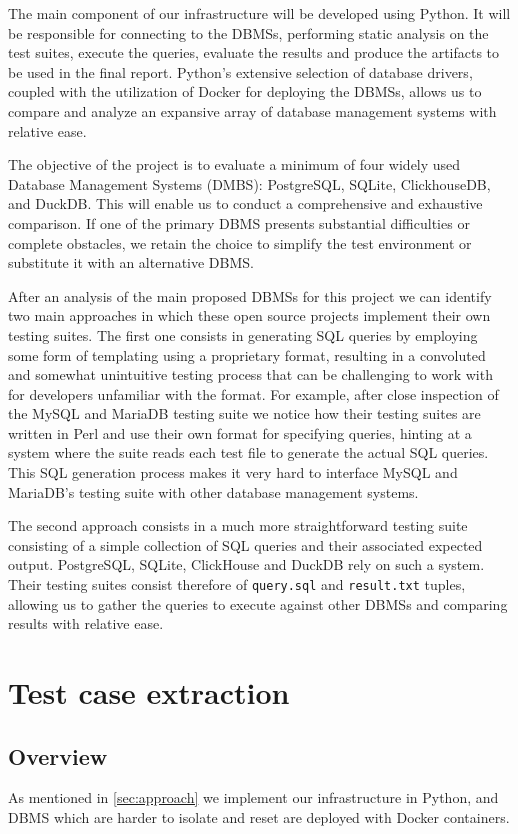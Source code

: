\documentclass[acmsmall,nonacm]{acmart}
\begin{document}
The main component of our infrastructure will be developed using Python. It will be responsible for connecting to the DBMSs, performing static analysis on the test suites, execute the queries, evaluate the results and produce the artifacts to be used in the final report. Python's extensive selection of database drivers, coupled with the utilization of Docker for deploying the DBMSs, allows us to compare and analyze an expansive array of database management systems with relative ease. 

The objective of the project is to evaluate a minimum of four widely used Database Management Systems (DMBS): PostgreSQL, SQLite, ClickhouseDB, and DuckDB. This will enable us to conduct a comprehensive and exhaustive comparison. If one of the primary DBMS presents substantial difficulties or complete obstacles, we retain the choice to simplify the test environment or substitute it with an alternative DBMS.

After an analysis of the main proposed DBMSs for this project we can identify two main approaches in which these open source projects implement their own testing suites. The first one consists in generating SQL queries by employing some form of templating using a proprietary format, resulting in a convoluted and somewhat unintuitive testing process that can be challenging to work with for developers unfamiliar with the format.
For example, after close inspection of the MySQL and MariaDB testing suite we notice how their testing suites are written in Perl and use their own format for specifying queries, hinting at a system where the suite reads each test file to generate the actual SQL queries. This SQL generation process makes it very hard to interface MySQL and MariaDB's testing suite with other database management systems. 

The second approach consists in a much more straightforward testing suite consisting of a simple collection of SQL queries and their associated expected output.
PostgreSQL, SQLite, ClickHouse and DuckDB rely on such a system. Their testing suites consist therefore of \texttt{query.sql} and \texttt{result.txt} tuples, allowing us to gather the queries to execute against other DBMSs and comparing results with relative ease.


\section{Test case extraction}

\subsection{Overview}
As mentioned in \autoref{sec:approach} we implement our infrastructure in Python, and DBMS which are harder to isolate and reset are deployed with Docker containers.
\end{document}
